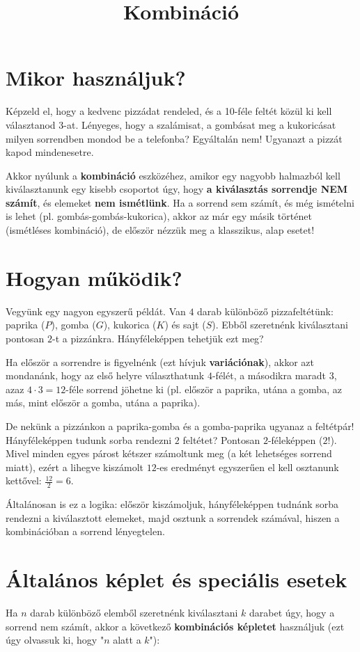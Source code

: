 \documentclass[11pt,a4paper]{article}
\title{Kombináció}
\author{}
\date{}
\begin{document}
\maketitle



\section{Mikor használjuk?}
Képzeld el, hogy a kedvenc pizzádat rendeled, és a 10-féle feltét közül ki kell választanod 3-at. Lényeges, hogy a szalámisat, a gombásat meg a kukoricásat milyen sorrendben mondod be a telefonba? Egyáltalán nem! Ugyanazt a pizzát kapod mindenesetre. 

Akkor nyúlunk a \textbf{kombináció} eszközéhez, amikor egy nagyobb halmazból kell kiválasztanunk egy kisebb csoportot úgy, hogy \textbf{a kiválasztás sorrendje NEM számít}, és elemeket \textbf{nem ismétlünk}. Ha a sorrend sem számít, és még ismételni is lehet (pl. gombás-gombás-kukorica), akkor az már egy másik történet (ismétléses kombináció), de először nézzük meg a klasszikus, alap esetet!

\section{Hogyan működik?}
Vegyünk egy nagyon egyszerű példát. Van $4$ darab különböző pizzafeltétünk: paprika ($P$), gomba ($G$), kukorica ($K$) és sajt ($S$). Ebből szeretnénk kiválasztani pontosan $2$-t a pizzánkra. Hányféleképpen tehetjük ezt meg?

Ha először a sorrendre is figyelnénk (ezt hívjuk \textbf{variációnak}), akkor azt mondanánk, hogy az első helyre választhatunk $4$-félét, a másodikra maradt $3$, azaz $4 \cdot 3 = 12$-féle sorrend jöhetne ki (pl. először a paprika, utána a gomba, az más, mint először a gomba, utána a paprika). 

De nekünk a pizzánkon a paprika-gomba és a gomba-paprika ugyanaz a feltétpár! Hányféleképpen tudunk sorba rendezni $2$ feltétet? Pontosan $2$-féleképpen ($2!$). Mivel minden egyes párost kétszer számoltunk meg (a két lehetséges sorrend miatt), ezért a lihegve kiszámolt $12$-es eredményt egyszerűen el kell osztanunk kettővel: $\frac{12}{2} = 6$.

Általánosan is ez a logika: először kiszámoljuk, hányféleképpen tudnánk sorba rendezni a kiválasztott elemeket, majd osztunk a sorrendek számával, hiszen a kombinációban a sorrend lényegtelen.

\section{Általános képlet és speciális esetek}
Ha $n$ darab különböző elemből szeretnénk kiválasztani $k$ darabet úgy, hogy a sorrend nem számít, akkor a következő \textbf{kombinációs képletet} használjuk (ezt úgy olvassuk ki, hogy "$n$ alatt a $k$"):
\end{document}
